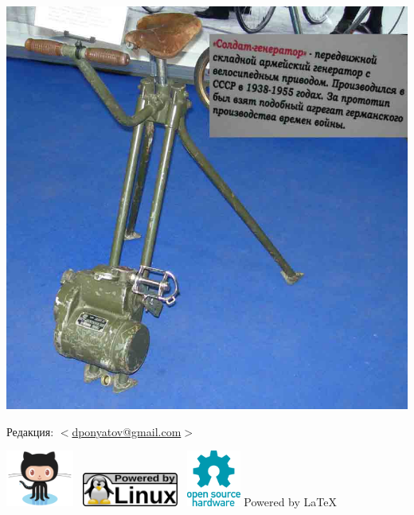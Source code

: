 \begin{titlepage}
\begin{flushright}
\noindent\includegraphics[width=0.4\paperheight]{01/soldgen.jpg}
\end{flushright}

\bigskip
Редакция: $<$\href{mailto:dponyatov@gmail.com}{dponyatov@gmail.com}$>$

\bigskip
\href{https://github.com/ponyatov/scratcher}{\includegraphics[height=5em]{logo/GitHub.png}}
\ \includegraphics[height=3em]{logo/linuxpowered.png}
\ \includegraphics[height=5em]{logo/OpenHardware.png}
{\Large Powered by \LaTeX}

\end{titlepage}

\tableofcontents\clearpage

